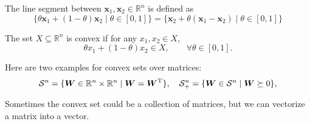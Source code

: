\begin{definition}
The line segment between $\bm x_1,\bm x_2\in\mathbb{R}^n$ is defined as
\[
\{
\theta\bm x_1 + (1-\theta)\bm x_2\mid 
\theta\in[0,1]
\}
=
\{
\bm x_2 + \theta(\bm x_1-\bm x_2)\mid \theta\in[0,1]
\}
\]
\end{definition}

\begin{definition}
The set $X\subseteq\mathbb{R}^n$ is convex if for any $x_1,x_2\in X$,
\[
\theta x_1 + (1-\theta)x_2\in X,\qquad
\forall\theta\in[0,1].
\]
\end{definition}
Here are two examples for convex sets over matrices:
\[
\mathcal{S}^n = \{\bm W\in\mathbb{R}^n\times\mathbb{R}^n\mid \bm W=\bm W^{\mathrm T}\},
\quad
\mathcal{S}^n_+ = \{\bm W\in\mathcal{S}^n\mid \bm W\succeq0\},
\]
\begin{remark}
Sometimes the convex set could be a collection of matrices, but we can vectorize a matrix into a vector.
\end{remark}

